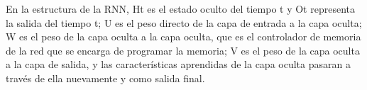 En la estructura de la RNN, Ht es el estado oculto del tiempo t y Ot representa la salida del tiempo t; U es el peso directo de la capa de entrada a la capa oculta; W es el peso de la capa oculta a la capa oculta, que es el controlador de memoria de la red que se encarga de programar la memoria; V es el peso de la capa oculta a la capa de salida, y las características aprendidas de la capa oculta pasaran a través de ella nuevamente y como salida final.

 